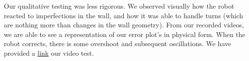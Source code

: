 \documentclass{article}
\begin{document}
Our qualitative testing was less rigorous. We observed visually how the robot reacted to imperfections in the wall, and how it was able to handle turns (which are nothing more than changes in the wall geometry). From our recorded videos, we are able to see a representation of our error plot’s in physical form. When the robot corrects, there is some overshoot and subsequent oscillations. We have provided a \href{https://drive.google.com/file/d/1AO_3WzXyMMgyawGHh4i-X2u07TG5eoCh/view?usp=sharing}{link} our video test.



\end{document}
